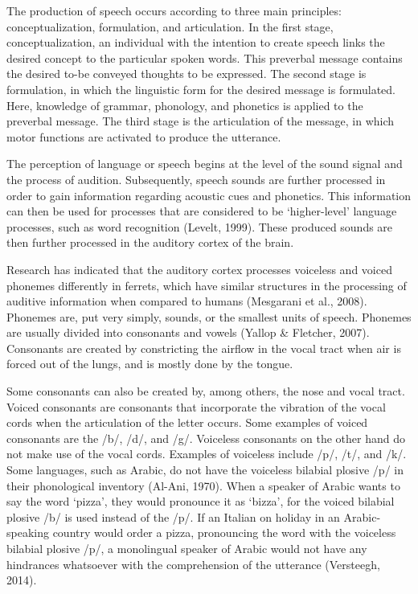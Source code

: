 The production of speech occurs according to three main principles: conceptualization, formulation, and articulation. In the first stage, conceptualization, an individual with the intention to create speech links the desired concept to the particular spoken words. This preverbal message contains the desired to-be conveyed thoughts to be expressed. The second stage is formulation, in which the linguistic form for the desired message is formulated. Here, knowledge of grammar, phonology, and phonetics is applied to the preverbal message. The third stage is the articulation of the message, in which motor functions are activated to produce the utterance. 

The perception of language or speech begins at the level of the sound signal and the process of audition. Subsequently, speech sounds are further processed in order to gain information regarding acoustic cues and phonetics. This information can then be used for processes that are considered to be ‘higher-level’ language processes, such as word recognition (Levelt, 1999). These produced sounds are then further processed in the auditory cortex of the brain. 

Research has indicated that the auditory cortex processes voiceless and voiced phonemes differently in ferrets, which have similar structures in the processing of auditive information when compared to humans (Mesgarani et al., 2008). Phonemes are, put very simply, sounds, or the smallest units of speech. Phonemes are usually divided into consonants and vowels (Yallop \& Fletcher, 2007). Consonants are created by constricting the airflow in the vocal tract when air is forced out of the lungs, and is mostly done by the tongue. 

Some consonants can also be created by, among others, the nose and vocal tract. Voiced consonants are consonants that incorporate the vibration of the vocal cords when the articulation of the letter occurs. Some examples of voiced consonants are the /b/, /d/, and /g/. Voiceless consonants on the other hand do not make use of the vocal cords. Examples of voiceless include /p/, /t/, and /k/. Some languages, such as Arabic, do not have the voiceless bilabial plosive /p/ in their phonological inventory (Al-Ani, 1970). When a speaker of Arabic wants to say the word ‘pizza’, they would pronounce it as ‘bizza’, for the voiced bilabial plosive /b/ is used instead of the /p/. If an Italian on holiday in an Arabic-speaking country would order a pizza, pronouncing the word with the voiceless bilabial plosive /p/, a monolingual speaker of Arabic would not have any hindrances whatsoever with the comprehension of the utterance (Versteegh, 2014). 

